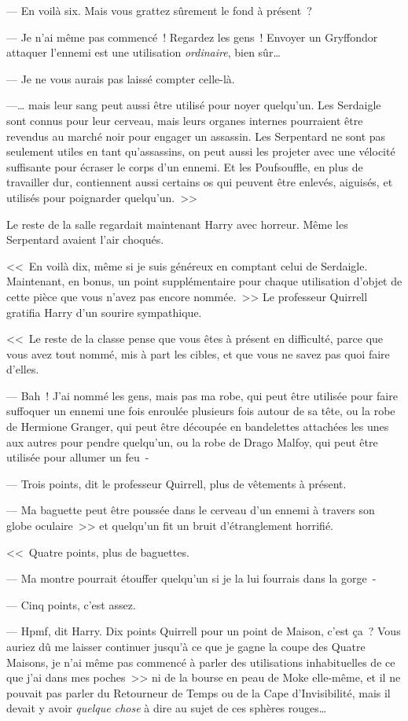 --- En voilà six. Mais vous grattez sûrement le fond à présent~?

--- Je n'ai même pas commencé~! Regardez les gens~! Envoyer un Gryffondor attaquer l'ennemi est une utilisation \emph{ordinaire}, bien sûr…

--- Je ne vous aurais pas laissé compter celle-là.

---… mais leur sang peut aussi être utilisé pour noyer quelqu'un. Les Serdaigle sont connus pour leur cerveau, mais leurs organes internes pourraient être revendus au marché noir pour engager un assassin. Les Serpentard ne sont pas seulement utiles en tant qu'assassins, on peut aussi les projeter avec une vélocité suffisante pour écraser le corps d'un ennemi. Et les Poufsouffle, en plus de travailler dur, contiennent aussi certains os qui peuvent être enlevés, aiguisés, et utilisés pour poignarder quelqu'un.~>>

Le reste de la salle regardait maintenant Harry avec horreur. Même les Serpentard avaient l'air choqués.

<<~En voilà dix, même si je suis généreux en comptant celui de Serdaigle. Maintenant, en bonus, un point supplémentaire pour chaque utilisation d'objet de cette pièce que vous n'avez pas encore nommée.~>> Le professeur Quirrell gratifia Harry d'un sourire sympathique.

<<~Le reste de la classe pense que vous êtes à présent en difficulté, parce que vous avez tout nommé, mis à part les cibles, et que vous ne savez pas quoi faire d'elles.

--- Bah~! J'ai nommé les gens, mais pas ma robe, qui peut être utilisée pour faire suffoquer un ennemi une fois enroulée plusieurs fois autour de sa tête, ou la robe de Hermione Granger, qui peut être découpée en bandelettes attachées les unes aux autres pour pendre quelqu'un, ou la robe de Drago Malfoy, qui peut être utilisée pour allumer un feu~-

--- Trois points, dit le professeur Quirrell, plus de vêtements à présent.

--- Ma baguette peut être poussée dans le cerveau d'un ennemi à travers son globe oculaire~>> et quelqu'un fit un bruit d'étranglement horrifié.

<<~Quatre points, plus de baguettes.

--- Ma montre pourrait étouffer quelqu'un si je la lui fourrais dans la gorge~-

--- Cinq points, c'est assez.

--- Hpmf, dit Harry. Dix points Quirrell pour un point de Maison, c'est ça~? Vous auriez dû me laisser continuer jusqu'à ce que je gagne la coupe des Quatre Maisons, je n'ai même pas commencé à parler des utilisations inhabituelles de ce que j'ai dans mes poches~>> ni de la bourse en peau de Moke elle-même, et il ne pouvait pas parler du Retourneur de Temps ou de la Cape d'Invisibilité, mais il devait y avoir \emph{quelque chose} à dire au sujet de ces sphères rouges…

